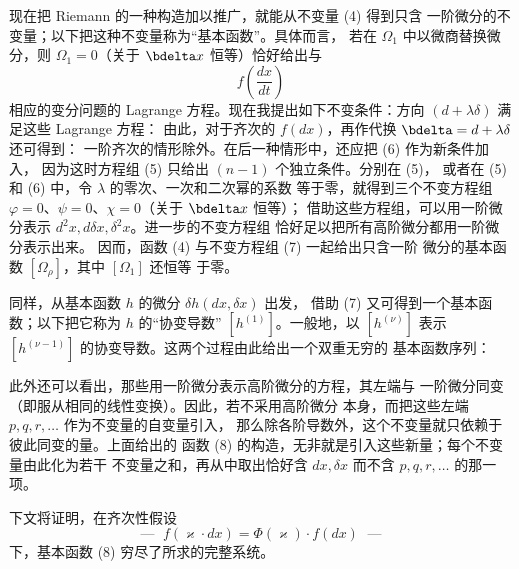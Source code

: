 现在把 Riemann 的一种构造加以推广，就能从不变量 (4) 得到只含
一阶微分的不变量；以下把这种不变量称为“基本函数”。具体而言，
若在 \(\Omega_1\) 中以微商替换微分，则 \(\Omega_1=0\)（关于
\(\bdelta x\) 恒等）恰好给出与
\[
f\!\left(\frac{dx}{dt}\right)
\]
相应的变分问题的 Lagrange 方程。现在我提出如下不变条件：方向
\((d+\lambda\delta)\) 满足这些 Lagrange 方程：
由此，对于齐次的 \(f(dx)\)，再作代换 \(\bdelta=d+\lambda\delta\)
还可得到：
一阶齐次的情形除外。在后一种情形中，还应把 (6) 作为新条件加入，
因为这时方程组 (5) 只给出 \((n-1)\) 个独立条件。分别在 (5)，
或者在 (5) 和 (6) 中，令 \(\lambda\) 的零次、一次和二次幂的系数
等于零，就得到三个不变方程组
\(\varphi=0\)、\(\psi=0\)、\(\chi=0\)（关于 \(\bdelta x\) 恒等）；
借助这些方程组，可以用一阶微分表示
\(d^2x,d\delta x,\delta^2x\)。进一步的不变方程组
恰好足以把所有高阶微分都用一阶微分表示出来。 因而，函数 (4) 与不变方程组 (7) 一起给出只含一阶
微分的基本函数 \([\Omega_\rho]\)，其中 \([\Omega_1]\) 还恒等
于零。

同样，从基本函数 \(h\) 的微分 \(\delta h(dx,\delta x)\) 出发，
借助 (7) 又可得到一个基本函数；以下把它称为 \(h\) 的“协变导数”
\([h^{(1)}]\)。一般地，以 \([h^{(\nu)}]\) 表示
\([h^{(\nu-1)}]\) 的协变导数。这两个过程由此给出一个双重无穷的
基本函数序列：

此外还可以看出，那些用一阶微分表示高阶微分的方程，其左端与
一阶微分同变（即服从相同的线性变换）。因此，若不采用高阶微分
本身，而把这些左端 \(p,q,r,\ldots\) 作为不变量的自变量引入，
那么除各阶导数外，这个不变量就只依赖于彼此同变的量。上面给出的
函数 (8) 的构造，无非就是引入这些新量；每个不变量由此化为若干
不变量之和，再从中取出恰好含 \(dx,\delta x\) 而不含
\(p,q,r,\ldots\) 的那一项。

下文将证明，在齐次性假设
\[
\text{--- }\;f(\varkappa\cdot dx)=\Phi(\varkappa)\cdot f(dx)\;\text{ ---}
\]
下，基本函数 (8) 穷尽了所求的完整系统。

